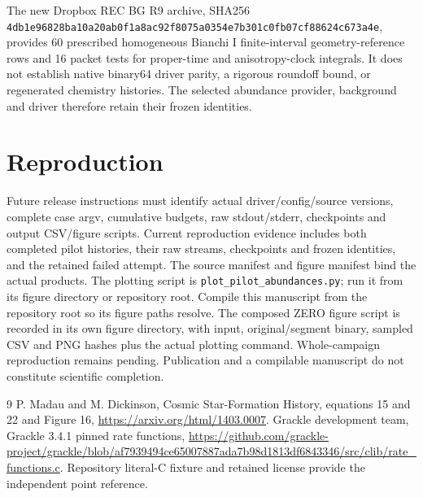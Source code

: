 \documentclass[11pt]{article}
\begin{document}
The new Dropbox REC BG R9 archive, SHA256 \texttt{4db1e96828ba10a20ab0f1a8ac92f8075a0354e7b301c0fb07cf88624c673a4e}, provides 60 prescribed homogeneous Bianchi I finite-interval geometry-reference rows and 16 packet tests for proper-time and anisotropy-clock integrals. It does not establish native binary64 driver parity, a rigorous roundoff bound, or regenerated chemistry histories. The selected abundance provider, background and driver therefore retain their frozen identities.

\section{Reproduction}
Future release instructions must identify actual driver/config/source versions, complete case argv, cumulative budgets, raw stdout/stderr, checkpoints and output CSV/figure scripts. Current reproduction evidence includes both completed pilot histories, their raw streams, checkpoints and frozen identities, and the retained failed attempt. The source manifest and figure manifest bind the actual products. The plotting script is \texttt{plot\_pilot\_abundances.py}; run it from its figure directory or repository root. Compile this manuscript from the repository root so its figure paths resolve. The composed ZERO figure script is recorded in its own figure directory, with input, original/segment binary, sampled CSV and PNG hashes plus the actual plotting command. Whole-campaign reproduction remains pending. Publication and a compilable manuscript do not constitute scientific completion.
\begin{thebibliography}{9}
 P. Madau and M. Dickinson, Cosmic Star-Formation History, equations 15 and 22 and Figure 16, \url{https://arxiv.org/html/1403.0007}.
 Grackle development team, Grackle 3.4.1 pinned rate functions, \url{https://github.com/grackle-project/grackle/blob/af7939494ce65007887ada7b98d1813df6843346/src/clib/rate_functions.c}. Repository literal-C fixture and retained license provide the independent point reference.
\end{thebibliography}
\end{document}
